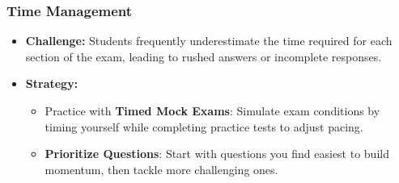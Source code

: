 \documentclass{beamer}
\begin{document}
\begin{frame}[fragile]
    \frametitle{Time Management}
    \begin{itemize}
        \item \textbf{Challenge:} Students frequently underestimate the time required for each section of the exam, leading to rushed answers or incomplete responses.
        \item \textbf{Strategy:}
        \begin{itemize}
            \item Practice with \textbf{Timed Mock Exams}: Simulate exam conditions by timing yourself while completing practice tests to adjust pacing.
            \item \textbf{Prioritize Questions}: Start with questions you find easiest to build momentum, then tackle more challenging ones.
        \end{itemize}
    \end{itemize}
\end{frame}
\end{document}
